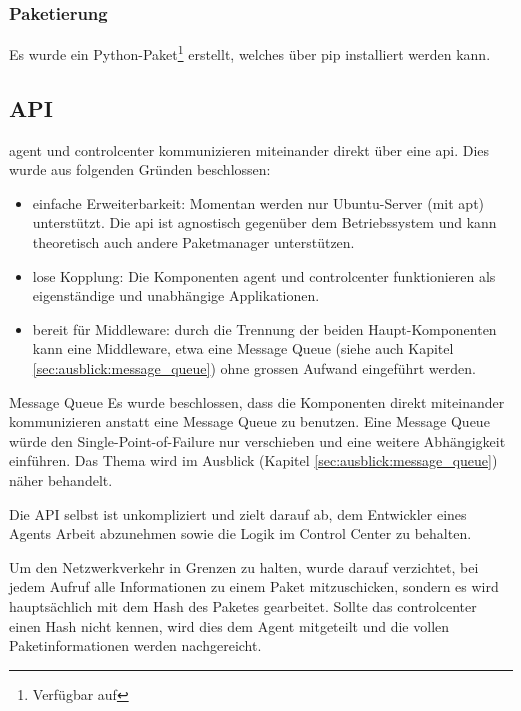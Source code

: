 \subsubsection*{Paketierung}

Es wurde ein Python-Paket\footnote{Verfügbar auf } erstellt, welches über \gls{pip} installiert werden kann.

\clearpage
\subsection*{API} \label{sec:architecture:api}

\gls{agent} und \gls{controlcenter} kommunizieren miteinander direkt über eine \gls{api}. Dies wurde aus folgenden Gründen beschlossen:

\begin{itemize}
    \item einfache Erweiterbarkeit: Momentan werden nur Ubuntu-Server (mit \gls{apt}) unterstützt. Die \gls{api} ist agnostisch gegenüber dem Betriebssystem und kann theoretisch auch andere Paketmanager unterstützen.
    \item lose Kopplung: Die Komponenten \gls{agent} und \gls{controlcenter} funktionieren als eigenständige und unabhängige Applikationen.
    \item bereit für Middleware: durch die Trennung der beiden Haupt-Komponenten kann eine Middleware, etwa eine Message Queue (siehe auch Kapitel \ref{sec:ausblick:message_queue}) ohne grossen Aufwand eingeführt werden.
\end{itemize}


\begin{decision}{Message Queue}
Es wurde beschlossen, dass die Komponenten direkt miteinander kommunizieren anstatt eine Message Queue zu benutzen. Eine Message Queue würde den Single-Point-of-Failure nur verschieben und eine weitere Abhängigkeit einführen. Das Thema wird im Ausblick (Kapitel \ref{sec:ausblick:message_queue}) näher behandelt.
\end{decision}


Die API selbst ist unkompliziert und zielt darauf ab, dem Entwickler eines Agents Arbeit abzunehmen sowie die Logik im Control Center zu behalten.

Um den Netzwerkverkehr in Grenzen zu halten, wurde darauf verzichtet, bei jedem Aufruf alle Informationen zu einem Paket mitzuschicken, sondern es wird hauptsächlich mit dem Hash des Paketes gearbeitet. Sollte das \gls{controlcenter} einen Hash nicht kennen, wird dies dem Agent mitgeteilt und die vollen Paketinformationen werden nachgereicht.

